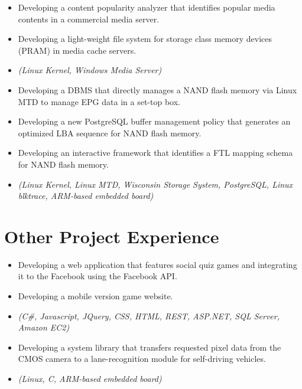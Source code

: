 \begin{itemize}
    \item {Developing a content popularity analyzer that identifies
        popular media contents in a commercial media server.}
    \item{Developing a light-weight file system for storage class memory devices (PRAM) in media cache servers.}
    \item{\it\small(Linux Kernel, Windows Media Server)}
\end{itemize}

\begin{itemize}
    \item{Developing a DBMS that directly manages a NAND flash memory
        via Linux MTD to manage EPG data in a set-top box.}
    \item{Developing a new PostgreSQL buffer management policy
        that generates an optimized LBA sequence for NAND flash memory.}
    \item{Developing an interactive framework that
        identifies a FTL mapping schema for NAND flash memory.}
    \item{\it\small(Linux Kernel, Linux MTD, Wisconsin Storage System, PostgreSQL,
        Linux blktrace, ARM-based embedded board)}
\end{itemize}

\section{Other Project Experience}

\begin{itemize}
    \item{Developing a web application that features social quiz games and
        integrating it to the Facebook using the Facebook API.}
    \item{Developing a mobile version game website.}
    \item{\it\small(C\#, Javascript, JQuery, CSS, HTML, REST, ASP.NET, SQL Server, Amazon EC2)}
\end{itemize}

\begin{itemize}
    \item {Developing a system library that transfers requested pixel data from the CMOS camera
        to a lane-recognition module for self-driving vehicles.}
    \item{\it\small(Linux, C, ARM-based embedded board)}
\end{itemize}


